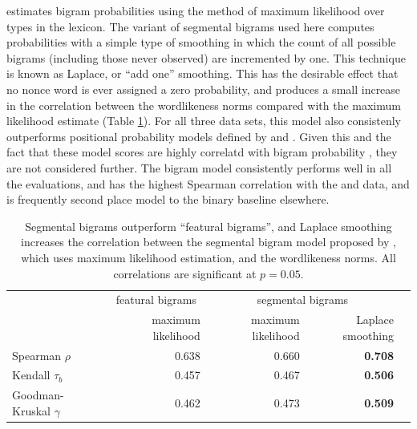 \citeauthor{Albright2009a} estimates bigram probabilities using the method of maximum likelihood over types in the lexicon. The variant of segmental bigrams used here computes probabilities with a simple type of smoothing in which the count of all possible bigrams (including those never observed) are incremented by one. This technique is known as Laplace, or ``add one'' smoothing. This has the desirable effect that no nonce word is ever assigned a zero probability, and produces a small increase in the correlation between the \citeauthor{Albright2003b} wordlikeness norms compared with the maximum likelihood estimate (Table \ref{albrightimproved}). For all three data sets, this model also consistenly outperforms positional probability models defined by \citet{Vitevitch2004} and \citet{Vaden2009}. 
Given this and the fact that these model scores are highly correlatd with bigram probability \citep[][54]{Vitevitch1997}, they are not considered further. The bigram model consistently performs well in all the evaluations, and has the highest Spearman correlation with the \citeauthor{Greenberg1964} and \citeauthor{Scholes1966} data, and is frequently second place model to the binary baseline elsewhere.

\begin{table} 
\centering
\begin{tabular}{l r r r r}
\toprule
                         & \multicolumn{1}{c}{featural bigrams} & \multicolumn{2}{c}{segmental bigrams}  \\
                         & maximum likelihood                   & maximum likelihood & Laplace smoothing \\
\midrule
Spearman $\rho$          & 0.638                                & 0.660              & \textbf{0.708}    \\
Kendall $\tau_b$         & 0.457                                & 0.467              & \textbf{0.506}    \\
Goodman-Kruskal $\gamma$ & 0.462                                & 0.473              & \textbf{0.509}    \\
\bottomrule
\end{tabular}
\caption{Segmental bigrams outperform ``featural bigrams'', and Laplace smoothing increases the correlation between the segmental bigram model proposed by \citet{Albright2009a}, which uses maximum likelihood estimation, and the \citet{Albright2003b} wordlikeness norms. All correlations are significant at $p = 0.05$.}
\label{albrightimproved}
\end{table}


